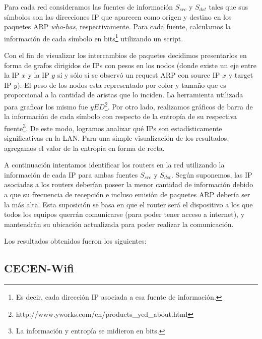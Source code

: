 \documentclass[10pt, a4paper]{article}
\begin{document}
Para cada red consideramos las fuentes de información $S_{src}$ y $S_{dst}$ tales que sus símbolos son las direcciones IP que aparecen como origen y destino en los paquetes ARP \textit{who-has}, respectivamente. Para cada fuente, calculamos la información de cada símbolo en bits\footnote{Es decir, cada dirección IP asociada a esa fuente de información.} utilizando un script.

Con el fin de visualizar los intercambios de paquetes decidimos presentarlos en forma de grafos dirigidos de IPs con pesos en los nodos (donde existe un eje entre la IP $x$ y la IP $y$ sí y sólo sí se observó un request ARP con source IP $x$ y target IP $y$). El peso de los nodos esta representado por color y tamaño que es proporcional a la cantidad de aristas que lo inciden. %
La herramienta utilizada para graficar los mismo fue $yED$\footnote{http://www.yworks.com/en/products\_yed\_about.html}.
Por otro lado, realizamos gráficos de barra de la información de cada símbolo con respecto de la entropía de su respectiva fuente\footnote{La información y entropía se midieron en bits.}. De este modo, logramos analizar qué IPs son estadísticamente significativas en la LAN. Para una simple visualización de los resultados, agregamos el valor de la entropía en forma de recta.

A continuación intentamos identificar los routers en la red utilizando la información de cada IP para ambas fuentes $S_{src}$ y $S_{dst}$. Según suponemos, las IP asociadas a los routers deberían poseer la menor cantidad de información debido a que su frecuencia de recepción e incluso emisión de paquetes ARP debería ser la más alta. Esta suposición se basa en que el router será el dispositivo a los que todos los equipos querrán comunicarse (para poder tener acceso a internet), y mantendrán su ubicación actualizada para poder realizar la comunicación.

Los resultados obtenidos fueron los siguientes:

\subsection{CECEN-Wifi}
\end{document}

